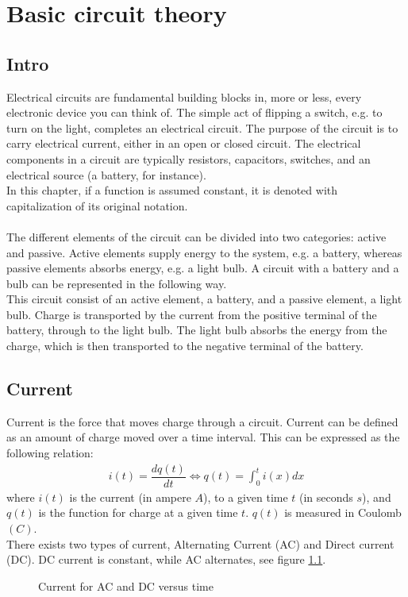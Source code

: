 \chapter{Basic circuit theory}
\section{Intro}
Electrical circuits are fundamental building blocks in, more or less, every electronic device you can think of. The simple act of flipping a switch, e.g. to turn on the light, completes an electrical circuit. The purpose of the circuit is to carry electrical current, either in an open or closed circuit. The electrical components in a circuit are typically resistors, capacitors,  switches, and an electrical 	source (a battery, for instance).
\\ 
In this chapter, if a function is assumed constant, it is denoted with capitalization of its original notation. 
\\ 
\\
The different elements of the circuit can be divided into two categories: active and passive. Active elements supply energy to the system, e.g. a battery, whereas passive elements absorbs energy, e.g. a light bulb. A circuit with a battery and a bulb can be represented in the following way. 
\\ This circuit consist of an active element, a battery, and a passive element, a light bulb. Charge is transported by the current from the positive terminal of the battery, through to the light bulb. The light bulb absorbs the energy from the charge, which is then transported to the negative terminal of the battery.
\\
\section{Current}
Current is the force that moves charge through a circuit. Current can be defined as an amount of charge moved over a time interval. This can be expressed as the following relation:
\begin{align}
i(t)=\dfrac{dq(t)}{dt} \Leftrightarrow q(t)=\int_{0}^{t}i(x)dx
\end{align}
where $i(t)$ is the current (in ampere $A$), to a given time $t$ (in seconds $s$), and $q(t)$ is the function for charge at a given time $t$. $q(t)$ is measured in Coulomb$(C)$.
\\
There exists two types of current, Alternating Current (AC) and Direct current (DC). DC current is constant, while AC alternates, see figure \ref{fig:ACDC}. 
\begin{figure}[H] 

\caption{Current for AC and DC versus time}
\label{fig:ACDC}
\end{figure}
